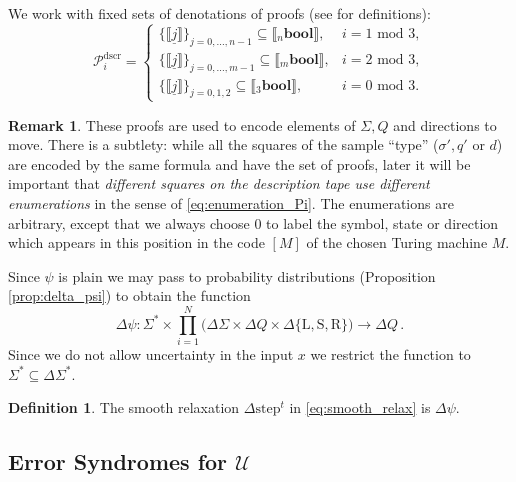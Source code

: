 \documentclass[english,letter paper,12pt,reqno]{article}
\theoremstyle{definition}
\newtheorem{definition}[theorem]{Definition}
\newtheorem{remark}[theorem]{Remark}
\def\be{\begin{equation}}
\def\ee{\end{equation}}
\newcommand{\lto}{\longrightarrow}
\begin{document}
We work with fixed sets of denotations of proofs (see \cite[Appendix B]{clift2020encodings} for definitions):
\begin{equation}
    \mathcal{P}_i^{\text{dscr}} =
    \begin{cases}
        \{\llbracket \underline{j} \rrbracket\}_{j = 0,\ldots, n-1}\subseteq \llbracket {}_{n}\textbf{bool} \rrbracket, & i = 1\text{ mod 3},\\
        \{\llbracket \underline{j} \rrbracket \}_{j = 0,\ldots, m-1}\subseteq \llbracket {}_{m}\textbf{bool} \rrbracket, & i = 2\text{ mod 3},\\
        \{\llbracket \underline{j} \rrbracket\}_{j = 0,1,2}\subseteq \llbracket {}_3\textbf{bool} \rrbracket, & i = 0\text{ mod 3}.
    \end{cases}
\end{equation}

\begin{remark}\label{remark:enum_proofs}
These proofs are used to encode elements of $\Sigma, Q$ and directions to move. There is a subtlety: while all the squares of the sample ``type'' ($\sigma',q'$ or $d$) are encoded by the same formula and have the set of proofs, later it will be important that \emph{different squares on the description tape use different enumerations} in the sense of \eqref{eq:enumeration_Pi}. The enumerations are arbitrary, except that we always choose $0$ to label the symbol, state or direction which appears in this position in the code $[M]$ of the chosen Turing machine $M$.
\end{remark}

Since $\psi$ is plain \cite[Lemma 3.4]{clift2020encodings} we may pass to probability distributions (Proposition \ref{prop:delta_psi}) to obtain the function
\be
\Delta \psi: \Sigma^* \times \prod_{i=1}^N \Big( \Delta \Sigma \times \Delta Q \times \Delta \{ \text{L}, \text{S}, \text{R} \}\Big) \lto \Delta Q \,.
\ee
Since we do not allow uncertainty in the input $x$ we restrict the function to $\Sigma^* \subseteq \Delta \Sigma^*$.

\begin{definition} The smooth relaxation $\Delta \textrm{step}^t$ in \eqref{eq:smooth_relax} is $\Delta \psi$.
\end{definition}

\subsection{Error Syndromes for $\mathcal{U}$}\label{section:error_syndromes_U}
\end{document}

